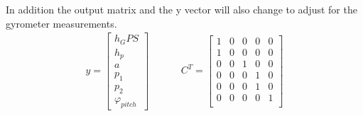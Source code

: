   
  In addition the output matrix and the y vector will also change to adjust for the gyrometer measurements.
  \begin{align*}
   y = \begin{bmatrix}
        h_GPS \\
        h_p \\
        a \\
        p_1\\
        p_2\\
        \varphi_{pitch}
       \end{bmatrix}
       & \hspace{1cm}
       C^T = \begin{bmatrix}
        1 & 0 & 0 & 0 & 0 \\
        1 & 0 & 0 & 0 & 0 \\
        0 & 0 & 1 & 0 & 0 \\
        0 & 0 & 0 & 1 & 0 \\
        0 & 0 & 0 & 1 & 0 \\
        0 & 0 & 0 & 0 & 1 \\
        \end{bmatrix}
  \end{align*}

  
